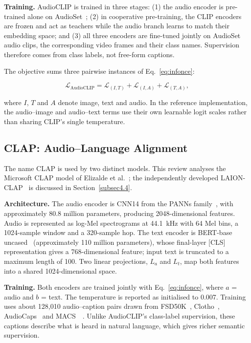 \documentclass[pdflatex,sn-mathphys-num]{sn-jnl}%
\theoremstyle{thmstyleone}%
\theoremstyle{thmstyletwo}%
\theoremstyle{thmstylethree}%
\begin{document}
\textbf{Training.} AudioCLIP is trained in three stages: (1) the audio encoder is pre-trained alone on AudioSet~\cite{gemmeke2017audioset}; (2) in cooperative pre-training, the CLIP encoders are frozen and act as teachers while the audio branch learns to match their embedding space; and (3) all three encoders are fine-tuned jointly on AudioSet audio clips, the corresponding video frames and their class names. Supervision therefore comes from class labels, not free-form captions.

The objective sums three pairwise instances of Eq.~\eqref{eq:infonce}:

\begin{equation}
\mathcal{L}_{\mathrm{AudioCLIP}} = \mathcal{L}_{(I,T)} + \mathcal{L}_{(I,A)} + \mathcal{L}_{(T,A)},
\label{eq:audioclip}
\end{equation}

where $I$, $T$ and $A$ denote image, text and audio. In the reference implementation, the audio--image and audio--text terms use their own learnable logit scales rather than sharing CLIP's single temperature. %

\subsection{CLAP: Audio--Language Alignment}\label{subsec4.3}

The name CLAP is used by two distinct models. This review analyses the Microsoft CLAP model of Elizalde et al.~\cite{elizalde2023clap}; the independently developed LAION-CLAP~\cite{wu2023laionclap} is discussed in Section~\ref{subsec4.4}.

\textbf{Architecture.} The audio encoder is CNN14 from the PANNs family~\cite{kong2020panns}, with approximately 80.8 million parameters, producing 2048-dimensional features. Audio is represented as log-Mel spectrograms at 44.1~kHz with 64 Mel bins, a 1024-sample window and a 320-sample hop. The text encoder is BERT-base uncased~\cite{devlin2019bert} (approximately 110 million parameters), whose final-layer [CLS] representation gives a 768-dimensional feature; input text is truncated to a maximum length of 100. %
Two linear projections, $L_a$ and $L_t$, map both features into a shared 1024-dimensional space.

\textbf{Training.} Both encoders are trained jointly with Eq.~\eqref{eq:infonce}, where $a$ = audio and $b$ = text. The temperature is reported as initialised to 0.007. %
Training uses about 128,010 audio--caption pairs drawn from FSD50K~\cite{fonseca2022fsd50k}, Clotho~\cite{drossos2020clotho}, AudioCaps~\cite{kim2019audiocaps} and MACS~\cite{martin2021macs}~\cite{elizalde2023clap}. Unlike AudioCLIP's class-label supervision, these captions describe what is heard in natural language, which gives richer semantic supervision.
\end{document}
